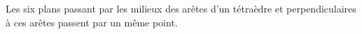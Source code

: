 Les six plans passant par les milieux des arêtes d'un tétraèdre et perpendiculaires à ces arêtes passent par un même point.
